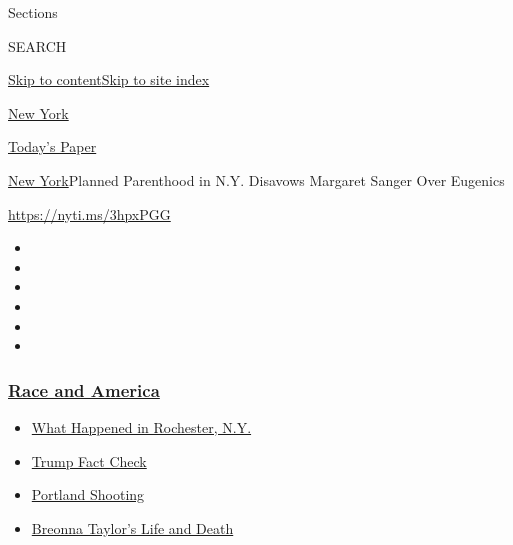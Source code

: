 Sections

SEARCH

\protect\hyperlink{site-content}{Skip to
content}\protect\hyperlink{site-index}{Skip to site index}

\href{https://www.nytimes3xbfgragh.onion/section/nyregion}{New York}

\href{https://myaccount.nytimes3xbfgragh.onion/auth/login?response_type=cookie\&client_id=vi}{}

\href{https://www.nytimes3xbfgragh.onion/section/todayspaper}{Today's
Paper}

\href{/section/nyregion}{New York}\textbar{}Planned Parenthood in N.Y.
Disavows Margaret Sanger Over Eugenics

\url{https://nyti.ms/3hpxPGG}

\begin{itemize}
\item
\item
\item
\item
\item
\item
\end{itemize}

\hypertarget{race-and-america}{%
\subsubsection{\texorpdfstring{\href{https://www.nytimes3xbfgragh.onion/news-event/george-floyd-protests-minneapolis-new-york-los-angeles?name=styln-george-floyd\&region=TOP_BANNER\&block=storyline_menu_recirc\&action=click\&pgtype=Article\&impression_id=2947c640-f295-11ea-84d9-09ec1c57291a\&variant=undefined}{Race
and America}}{Race and America}}\label{race-and-america}}

\begin{itemize}
\tightlist
\item
  \href{https://www.nytimes3xbfgragh.onion/2020/09/04/nyregion/rochester-police-daniel-prude.html?name=styln-george-floyd\&region=TOP_BANNER\&block=storyline_menu_recirc\&action=click\&pgtype=Article\&impression_id=2947c641-f295-11ea-84d9-09ec1c57291a\&variant=undefined}{What
  Happened in Rochester, N.Y.}
\item
  \href{https://www.nytimes3xbfgragh.onion/2020/09/01/us/politics/trump-fact-check-protests.html?name=styln-george-floyd\&region=TOP_BANNER\&block=storyline_menu_recirc\&action=click\&pgtype=Article\&impression_id=2947c642-f295-11ea-84d9-09ec1c57291a\&variant=undefined}{Trump
  Fact Check}
\item
  \href{https://www.nytimes3xbfgragh.onion/2020/08/30/us/portland-shooting-explained.html?name=styln-george-floyd\&region=TOP_BANNER\&block=storyline_menu_recirc\&action=click\&pgtype=Article\&impression_id=2947c643-f295-11ea-84d9-09ec1c57291a\&variant=undefined}{Portland
  Shooting}
\item
  \href{https://www.nytimes3xbfgragh.onion/2020/08/30/us/breonna-taylor-police-killing.html?name=styln-george-floyd\&region=TOP_BANNER\&block=storyline_menu_recirc\&action=click\&pgtype=Article\&impression_id=2947c644-f295-11ea-84d9-09ec1c57291a\&variant=undefined}{Breonna
  Taylor's Life and Death}
\end{itemize}

